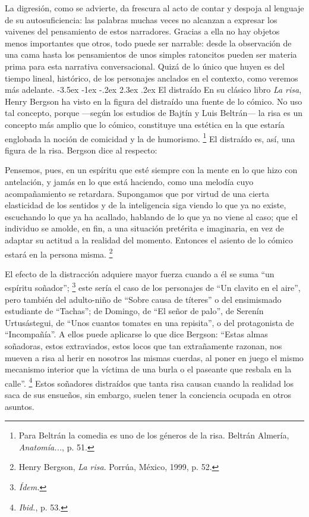 \documentclass[14pt,twoside,final]{extbook} %
\makeatletter
\let\oldfootnote\footnote
\renewcommand\footnote[1]{%
\oldfootnote{\hspace{1mm}#1}}
\renewcommand\section{\@startsection {section}{1}{\z@}%
                                     {-3.5ex \@plus -1ex \@minus -.2ex}%
                                     {2.3ex \@plus .2ex}%
                                     {\normalfont\large\bfseries\sc}}
\makeatother
\begin{document}
La digresión, como se advierte, da frescura al acto de contar y despoja al lenguaje de su autosuficiencia: las palabras muchas veces no alcanzan a expresar los vaivenes del pensamiento de estos narradores. Gracias a ella no hay objetos menos importantes que otros, todo puede ser narrable: desde la observación de una cama hasta los pensamientos de unos simples ratoncitos pueden ser materia prima para esta narrativa conversacional. Quizá de lo único que huyen es del tiempo lineal, histórico, de los personajes anclados en el contexto, como veremos más adelante.
\section{El distraído}\label{sec:el-distraido}
En su clásico libro \emph{La risa}, Henry Bergson ha visto en la figura del distraído una fuente de lo cómico. No uso tal concepto, porque ---según los estudios de Bajtín y Luis Beltrán--- la risa es un concepto más amplio que lo cómico, constituye una estética en la que estaría englobada la noción de comicidad y la de humorismo.\footnote{Para Beltrán la comedia es uno de los géneros de la risa. Beltrán Almería, \emph{Anatomía...}, p. 51.} El distraído es, así, una figura de la risa. Bergson dice al respecto:
\begin{quoting}
Pensemos, pues, en un espíritu que esté siempre con la mente en lo que hizo con antelación, y jamás en lo que está haciendo, como una melodía cuyo acompañamiento se retardara. Supongamos que por virtud de una cierta elasticidad de los sentidos y de la inteligencia siga viendo lo que ya no existe, escuchando lo que ya ha acallado, hablando de lo que ya no viene al caso; que el individuo se amolde, en fin, a una situación pretérita e imaginaria, en vez de adaptar su actitud a la realidad del momento. Entonces el asiento de lo cómico estará en la persona misma.\footnote{Henry Bergson, \emph{La risa}. Porrúa, México, 1999, p. 52.}
\end{quoting}
El efecto de la distracción adquiere mayor fuerza cuando a él se suma ``un espíritu soñador'';\footnote{\em Ídem.} este sería el caso de los personajes de ``Un clavito en el aire'', pero también del adulto-niño de ``Sobre causa de títeres'' o del ensimismado estudiante de ``Tachas''; de Domingo, de ``El señor de palo'', de Serenín Urtusástegui, de ``Unos cuantos tomates en una repisita'', o del protagonista de ``Incompañía''. A ellos puede aplicarse lo que dice Bergson: ``Estas almas soñadoras, estos extraviados, estos locos que tan extrañamente razonan, nos mueven a risa al herir en nosotros las mismas cuerdas, al poner en juego el mismo mecanismo interior que la víctima de una burla o el paseante que resbala en la calle''.\footnote{\emph{Ibid.}, p. 53.} Estos soñadores distraídos que tanta risa causan cuando la realidad los saca de sus ensueños, sin embargo, suelen tener la conciencia ocupada en otros asuntos.
\end{document}
